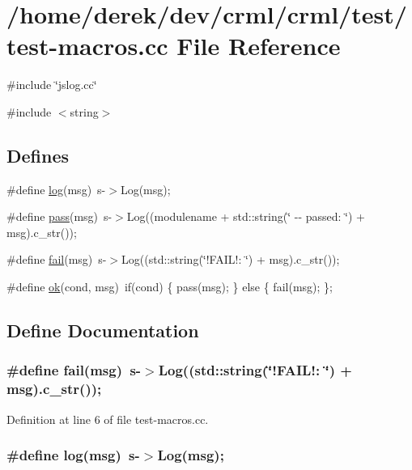 \hypertarget{test-macros_8cc}{
\section{/home/derek/dev/crml/crml/test/test-\/macros.cc File Reference}
\label{test-macros_8cc}
}
{\ttfamily \#include \char`\"{}jslog.cc\char`\"{}}\par
{\ttfamily \#include $<$string$>$}\par
\subsection*{Defines}
\begin{DoxyCompactItemize}
\item 
\#define \hyperlink{test-macros_8cc_a642fd9241bc9e4219ea15503ca87fefb}{log}(msg)~s-\/$>$Log(msg);
\item 
\#define \hyperlink{test-macros_8cc_af496d3b8121eb066859c5af577597d9c}{pass}(msg)~s-\/$>$Log((modulename + std::string(\char`\"{} -\/-\/ passed: \char`\"{}) + msg).c\_\-str());
\item 
\#define \hyperlink{test-macros_8cc_a05ec25e11ffdcaea9c4627c906388dd1}{fail}(msg)~s-\/$>$Log((std::string(\char`\"{}!FAIL!: \char`\"{}) + msg).c\_\-str());
\item 
\#define \hyperlink{test-macros_8cc_afaeb9641e4b11cff7242820dbb1c156d}{ok}(cond, msg)~if(cond) \{ pass(msg); \} else \{ fail(msg); \};
\end{DoxyCompactItemize}


\subsection{Define Documentation}
\hypertarget{test-macros_8cc_a05ec25e11ffdcaea9c4627c906388dd1}{
\subsubsection[{fail}]{\setlength{\rightskip}{0pt plus 5cm}\#define fail(msg)~s-\/$>$Log((std::string(\char`\"{}!FAIL!: \char`\"{}) + msg).c\_\-str());}}
\label{test-macros_8cc_a05ec25e11ffdcaea9c4627c906388dd1}


Definition at line 6 of file test-\/macros.cc.

\hypertarget{test-macros_8cc_a642fd9241bc9e4219ea15503ca87fefb}{
\subsubsection[{log}]{\setlength{\rightskip}{0pt plus 5cm}\#define log(msg)~s-\/$>$Log(msg);}}
\label{test-macros_8cc_a642fd9241bc9e4219ea15503ca87fefb}


